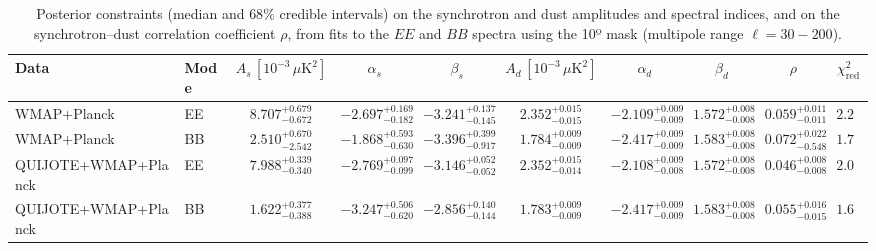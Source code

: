 \begin{table}[h]
\centering
\scriptsize
\setlength{\tabcolsep}{4pt}
\caption{Posterior constraints (median and $68\%$ credible intervals) on the synchrotron and dust amplitudes and spectral indices, and on the synchrotron--dust correlation coefficient $\rho$, from fits to the $EE$ and $BB$ spectra using the 10º mask (multipole range $\ell=30-200$).}
\label{tab:fit_no_QQ_autos_ell30-200}
\begin{tabular}{llcccccccc}
\toprule
Data & Mode & $A_s\,[10^{-3}\,\mu\mathrm{K}^2]$ & $\alpha_s$ & $\beta_s$ & $A_d\,[10^{-3}\,\mu\mathrm{K}^2]$ & $\alpha_d$ & $\beta_d$ & $\rho$ & $\chi^2_\mathrm{red}$ \\
\midrule
WMAP+Planck & EE & $8.707^{+0.679}_{-0.672}$ & $-2.697^{+0.169}_{-0.182}$ & $-3.241^{+0.137}_{-0.145}$ & $2.352^{+0.015}_{-0.015}$ & $-2.109^{+0.009}_{-0.009}$ & $1.572^{+0.008}_{-0.008}$ & $0.059^{+0.011}_{-0.011}$ & $2.26$ \\
WMAP+Planck & BB & $2.510^{+0.670}_{-2.542}$ & $-1.868^{+0.593}_{-0.630}$ & $-3.396^{+0.399}_{-0.917}$ & $1.784^{+0.009}_{-0.009}$ & $-2.417^{+0.009}_{-0.009}$ & $1.583^{+0.008}_{-0.008}$ & $0.072^{+0.022}_{-0.548}$ & $1.73$ \\
QUIJOTE+WMAP+Planck & EE & $7.988^{+0.339}_{-0.340}$ & $-2.769^{+0.097}_{-0.099}$ & $-3.146^{+0.052}_{-0.052}$ & $2.352^{+0.015}_{-0.014}$ & $-2.108^{+0.009}_{-0.008}$ & $1.572^{+0.008}_{-0.008}$ & $0.046^{+0.008}_{-0.008}$ & $2.00$ \\
QUIJOTE+WMAP+Planck & BB & $1.622^{+0.377}_{-0.388}$ & $-3.247^{+0.506}_{-0.620}$ & $-2.856^{+0.140}_{-0.144}$ & $1.783^{+0.009}_{-0.009}$ & $-2.417^{+0.009}_{-0.009}$ & $1.583^{+0.008}_{-0.008}$ & $0.055^{+0.016}_{-0.015}$ & $1.64$ \\
\bottomrule
\end{tabular}
\end{table}
